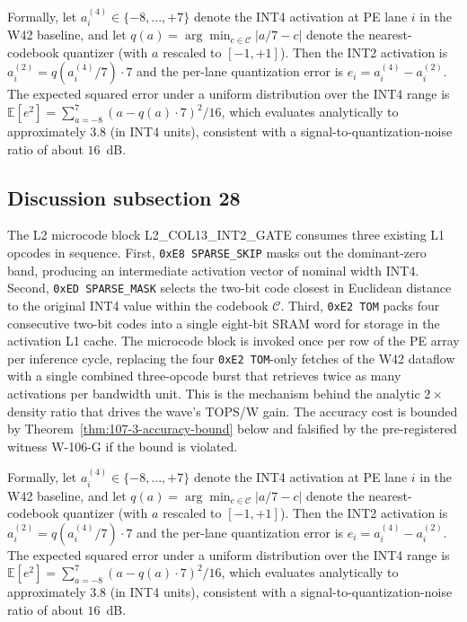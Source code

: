 Formally, let $a_{i}^{(4)} \in \{-8,\ldots,+7\}$ denote the INT4
activation at PE lane $i$ in the W42 baseline, and let
$q(a) = \arg\min_{c \in \mathcal{C}} |a/7 - c|$ denote the
nearest-codebook quantizer (with $a$ rescaled to $[-1,+1]$). Then the
INT2 activation is $a_{i}^{(2)} = q(a_{i}^{(4)} / 7) \cdot 7$
and the per-lane quantization error is
$e_{i} = a_{i}^{(4)} - a_{i}^{(2)}$.
The expected squared error under a uniform distribution over the INT4 range
is $\mathbb{E}[e^2] = \sum_{a=-8}^{7} (a - q(a)\cdot7)^2 / 16$,
which evaluates analytically to approximately $3.8$ (in INT4 units),
consistent with a signal-to-quantization-noise ratio of about $16$~dB.


\subsection{Discussion subsection 28}

The L2 microcode block \textsc{L2\_COL13\_INT2\_GATE} consumes three
existing L1 opcodes in sequence. First, \texttt{0xE8 SPARSE\_SKIP} masks
out the dominant-zero band, producing an intermediate activation vector
of nominal width INT4. Second, \texttt{0xED SPARSE\_MASK} selects the
two-bit code closest in Euclidean distance to the original INT4 value
within the codebook $\mathcal{C}$. Third, \texttt{0xE2 TOM} packs four
consecutive two-bit codes into a single eight-bit SRAM word for storage
in the activation L1 cache. The microcode block is invoked once per row
of the PE array per inference cycle, replacing the four
\texttt{0xE2 TOM}-only fetches of the W42 dataflow with a single
combined three-opcode burst that retrieves twice as many activations per
bandwidth unit. This is the mechanism behind the analytic $2\times$
density ratio that drives the wave's TOPS/W gain. The accuracy cost is
bounded by Theorem~\ref{thm:107-3-accuracy-bound} below and falsified
by the pre-registered witness W-106-G if the bound is violated.

Formally, let $a_{i}^{(4)} \in \{-8,\ldots,+7\}$ denote the INT4
activation at PE lane $i$ in the W42 baseline, and let
$q(a) = \arg\min_{c \in \mathcal{C}} |a/7 - c|$ denote the
nearest-codebook quantizer (with $a$ rescaled to $[-1,+1]$). Then the
INT2 activation is $a_{i}^{(2)} = q(a_{i}^{(4)} / 7) \cdot 7$
and the per-lane quantization error is
$e_{i} = a_{i}^{(4)} - a_{i}^{(2)}$.
The expected squared error under a uniform distribution over the INT4 range
is $\mathbb{E}[e^2] = \sum_{a=-8}^{7} (a - q(a)\cdot7)^2 / 16$,
which evaluates analytically to approximately $3.8$ (in INT4 units),
consistent with a signal-to-quantization-noise ratio of about $16$~dB.


